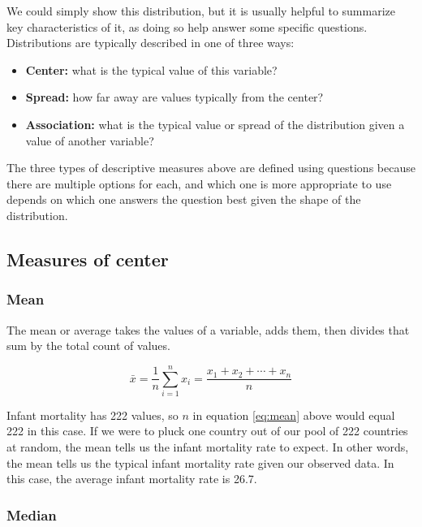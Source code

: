 \documentclass[
]{book}
\providecommand{\tightlist}{%
  \setlength{\itemsep}{0pt}\setlength{\parskip}{0pt}}
\begin{document}
We could simply show this distribution, but it is usually helpful to summarize key characteristics of it, as doing so help answer some specific questions. Distributions are typically described in one of three ways:

\begin{itemize}
\tightlist
\item
  \textbf{Center:} what is the typical value of this variable?
\item
  \textbf{Spread:} how far away are values typically from the center?
\item
  \textbf{Association:} what is the typical value or spread of the distribution given a value of another variable?
\end{itemize}

The three types of descriptive measures above are defined using questions because there are multiple options for each, and which one is more appropriate to use depends on which one answers the question best given the shape of the distribution.

\hypertarget{measures-of-center}{%
\subsection{Measures of center}\label{measures-of-center}}

\hypertarget{mean}{%
\subsubsection*{Mean}\label{mean}}

The mean or average takes the values of a variable, adds them, then divides that sum by the total count of values.

\begin{equation}
{\displaystyle \bar{x}={\frac {1}{n}}\sum _{i=1}^{n}x_{i}={\frac {x_{1}+x_{2}+\cdots +x_{n}}{n}}}
\label{eq:mean}
\end{equation}

Infant mortality has 222 values, so \(n\) in equation \eqref{eq:mean} above would equal 222 in this case. If we were to pluck one country out of our pool of 222 countries at random, the mean tells us the infant mortality rate to expect. In other words, the mean tells us the typical infant mortality rate given our observed data. In this case, the average infant mortality rate is 26.7.

\hypertarget{median}{%
\subsubsection*{Median}\label{median}}
\end{document}

